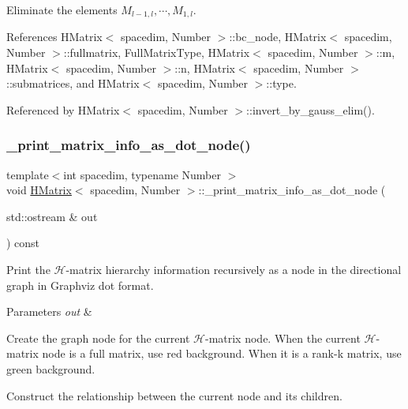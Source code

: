 Eliminate the elements $M_{l-1,l}, \cdots, M_{1,l}$.

References H\+Matrix$<$ spacedim, Number $>$\+::bc\+\_\+node, H\+Matrix$<$ spacedim, Number $>$\+::fullmatrix, Full\+Matrix\+Type, H\+Matrix$<$ spacedim, Number $>$\+::m, H\+Matrix$<$ spacedim, Number $>$\+::n, H\+Matrix$<$ spacedim, Number $>$\+::submatrices, and H\+Matrix$<$ spacedim, Number $>$\+::type.



Referenced by H\+Matrix$<$ spacedim, Number $>$\+::invert\+\_\+by\+\_\+gauss\+\_\+elim().

\mbox{\label{classHMatrix_afd8e08ec263ea524bef3c5c66796c61d}} 
\subsubsection{\texorpdfstring{\+\_\+print\+\_\+matrix\+\_\+info\+\_\+as\+\_\+dot\+\_\+node()}{\_print\_matrix\_info\_as\_dot\_node()}}
{\footnotesize\ttfamily template$<$int spacedim, typename Number $>$ \\
void \hyperlink{classHMatrix}{H\+Matrix}$<$ spacedim, Number $>$\+::\+\_\+print\+\_\+matrix\+\_\+info\+\_\+as\+\_\+dot\+\_\+node (\begin{DoxyParamCaption}\item[{std\+::ostream \&}]{out }\end{DoxyParamCaption}) const\hspace{0.3cm}{\ttfamily [private]}}

Print the $\mathcal{H}$-\/matrix hierarchy information recursively as a node in the directional graph in Graphviz dot format.


\begin{DoxyParams}{Parameters}
{\em out} & \\
\hline
\end{DoxyParams}
Create the graph node for the current $\mathcal{H}$-\/matrix node. When the current $\mathcal{H}$-\/matrix node is a full matrix, use red background. When it is a rank-\/k matrix, use green background.

Construct the relationship between the current node and its children.

